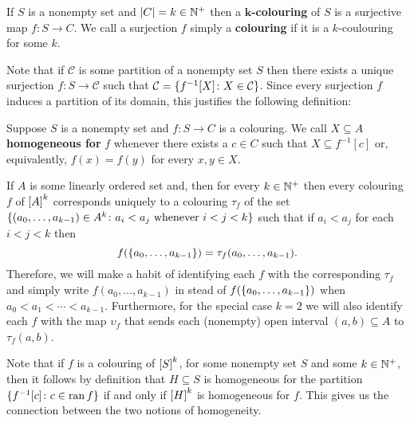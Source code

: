     \begin{dfn}[Colouring]\label{def:Col}
        If $S$ is a nonempty set and $\card{C}=k\in\posnats$ then a $\mathbf{k}$\textbf{-colouring} of $S$ is a surjective map $f\colon  S\to C$.  We call a surjection $f$ simply a \textbf{colouring} if it is a $k$-coulouring for some $k$.
    \end{dfn}

    Note that if $\mathcal{C}$ is some partition of a nonempty set $S$ then there exists a unique surjection $f\colon S\to \mathcal{C}$ such that $\mathcal{C}=\setbuild{f^{-1}[X]}{X\in \mathcal{C}}$. Since every surjection $f$ induces a partition of its domain, this justifies the following definition:

    \begin{dfn}
        Suppose $S$ is a nonempty set and $f\colon S\to C$ is a colouring.  We call $X\subseteq A$ \textbf{homogeneous for} $f$ whenever there exists a $c\in C$ such that $X\subseteq f^{-1}[c]$ or, equivalently, $f(x)=f(y)$ for every $x,y\in X$.
    \end{dfn}

    \begin{rem}\label{rem:Col}
        If $A$ is some linearly ordered set and, then for every $k\in\posnats$ then every colouring $f$ of $\subsets{k}{A}$ corresponds uniquely to a colouring $\tau_f$ of the set $\setbuild{(a_0,\dotsc,a_{k-1})\in A^k}{a_i<a_j\text{ whenever }i<j<k}$ such that if $a_i<a_j$ for each $i<j<k$ then
        \begin{equation}
            f(\set{a_0,\dotsc,a_{k-1}})=\tau_f(a_0,\dotsc,a_{k-1}).
        \end{equation}
        Therefore, we will make a habit of identifying each $f$ with the corresponding $\tau_f$ and simply write $f(a_0,\dotsc,a_{k-1})$ in stead of $f(\set{a_0,\dotsc,a_{k-1}})$ when $a_0<a_1<\dotsb<a_{k-1}$.  Furthermore, for the special case $k=2$ we will also identify each $f$ with the map $\upsilon_f$ that sends each (nonempty) open interval $(a,b)\subseteq A$ to $\tau_f(a,b)$.
    \end{rem}

    \begin{rem}
        Note that if $f$ is a colouring of $\subsets{k}{S}$, for some nonempty set $S$ and some $k\in\posnats$, then it follows by definition that $H\subseteq S$ is homogeneous for the partition $\setbuild{f^{-1}[c]}{c\in\range f}$ if and only if $\subsets{k}{H}$ is homogeneous for $f$.  This gives us the connection between the two notions of homogeneity.
    \end{rem}


